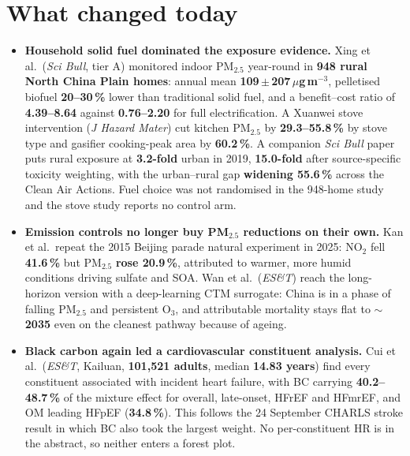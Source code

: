 \documentclass[10pt]{article}
\begin{document}
\vspace{3mm}

\section*{\sffamily\bfseries\color{Deep}What changed today}
\vspace{-1.5mm}{\color{Amber}\rule{\linewidth}{1.1pt}}\vspace{2.5mm}

\footnotesize
\begin{itemize}

\item \textbf{Household solid fuel dominated the exposure evidence.} Xing et al.\
(\textit{Sci Bull}, tier A) monitored indoor PM$_{2.5}$ year-round in \textbf{948 rural North
China Plain homes}: annual mean \textbf{109\,$\pm$\,207\,$\mu$g\,m$^{-3}$}, pelletised biofuel
\textbf{20--30\,\%} lower than traditional solid fuel, and a benefit--cost ratio of
\textbf{4.39--8.64} against \textbf{0.76--2.20} for full electrification. A Xuanwei stove
intervention (\textit{J Hazard Mater}) cut kitchen PM$_{2.5}$ by \textbf{29.3--55.8\,\%} by
stove type and gasifier cooking-peak area by \textbf{60.2\,\%}. A companion \textit{Sci Bull}
paper puts rural exposure at \textbf{3.2-fold} urban in 2019, \textbf{15.0-fold} after
source-specific toxicity weighting, with the urban--rural gap \textbf{widening 55.6\,\%} across
the Clean Air Actions. Fuel choice was not randomised in the 948-home study and the stove study
reports no control arm.

\item \textbf{Emission controls no longer buy PM$_{2.5}$ reductions on their own.} Kan et al.\
repeat the 2015 Beijing parade natural experiment in 2025: NO$_2$ fell \textbf{41.6\,\%} but
PM$_{2.5}$ \textbf{rose 20.9\,\%}, attributed to warmer, more humid conditions driving sulfate
and SOA. Wan et al.\ (\textit{ES\&T}) reach the long-horizon version with a deep-learning CTM
surrogate: China is in a phase of falling PM$_{2.5}$ and persistent O$_3$, and attributable
mortality stays flat to \textbf{$\sim$2035} even on the cleanest pathway because of ageing.

\item \textbf{Black carbon again led a cardiovascular constituent analysis.} Cui et al.\
(\textit{ES\&T}, Kailuan, \textbf{101,521 adults}, median \textbf{14.83 years}) find every
constituent associated with incident heart failure, with BC carrying \textbf{40.2--48.7\,\%} of
the mixture effect for overall, late-onset, HFrEF and HFmrEF, and OM leading HFpEF
(\textbf{34.8\,\%}). This follows the 24 September CHARLS stroke result in which BC also took
the largest weight. No per-constituent HR is in the abstract, so neither enters a forest plot.


\end{itemize}
\end{document}
